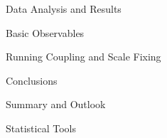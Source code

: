 \documentclass[twoside,english, a4paper, 11pt]{shared/uiofysmaster}
\begin{document}
\begin{part}{Data Analysis and Results}
	\label{part:results}
	\begin{chapter}{Basic Observables}
  		\label{chap:obs_results}
  		
	\end{chapter}

	\begin{chapter}{Running Coupling and Scale Fixing}
		\label{chap:advance_results}
		
  	\end{chapter}
\end{part}
 
\begin{part}{Conclusions}
	\label{part:conclusion}
	\begin{chapter}{Summary and Outlook}
		\label{chap:conclusion}
		
	\end{chapter}
	
\end{part}


\begin{appendices}
	\cleardoublepage
	\begin{chapter}{Statistical Tools}
		\label{appendix:resampling}
		
	\end{chapter}
\end{appendices}

%
\printbibliography

 
 
\end{document}
